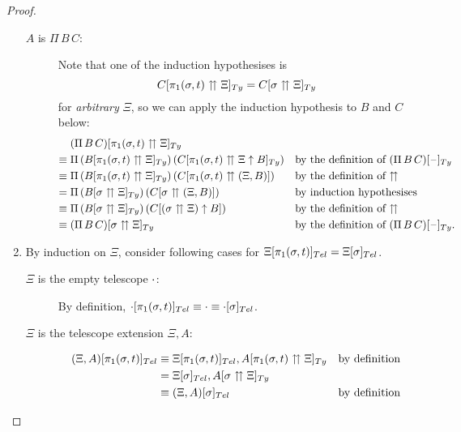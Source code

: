 \documentclass[a4paper,UKenglish,numberwithinsect,cleveref,thm-restate]{lipics-v2021}
\begin{document}
\begin{proof}
\begin{enumerate}
\begin{description}
        \item[$A$ is $\Pi\,B\,C$:]
          Note that one of the induction hypothesises is
          \[
            \subTy{C}{\pi_1(\sigma, t) \upuparrows \Xi} = \subTy{C}{\sigma \upuparrows \Xi}
          \]
          for \emph{arbitrary} $\Xi$, so we can apply the induction hypothesis to $B$ and $C$ below:
          \begin{align*}
            & \subTy{(\Pi\,B\,C)}{\pi_1(\sigma, t) \upuparrows \Xi} \\
            \judgeq{} & \Pi\,(\subTy{B}{\pi_1(\sigma, t) \upuparrows \Xi})\,(\subTy{C}{\pi_1(\sigma, t) \upuparrows \Xi \uparrow B}) && \text{by the definition of $\subTy{(\Pi\,B\,C)}{\blank}$} \\
            \judgeq{} & \Pi\,(\subTy{B}{\pi_1(\sigma, t) \upuparrows \Xi})\,(\sub{C}{\pi_1(\sigma, t) \upuparrows (\Xi, B)}) && \text{by the definition of $\upuparrows$} \\
            ={}       & \Pi\,(\subTy{B}{\sigma \upuparrows \Xi})\,(\sub{C}{\sigma \upuparrows (\Xi, B)}) && \text{by induction hypothesises} \\
            \judgeq{} & \Pi\,(\subTy{B}{\sigma \upuparrows \Xi})\,(\sub{C}{(\sigma \upuparrows \Xi) \uparrow B}) && \text{by the definition of $\upuparrows$} \\
            \judgeq{} & \subTy{(\Pi\,B\,C)}{\sigma\upuparrows \Xi} && \text{by the definition of $\subTy{(\Pi\,B\,C)}{\blank}$.}
          \end{align*}
      \end{description}
    \item By induction on $\Xi$, consider following cases for $\subTel{\Xi}{\pi_1(\sigma, t)} = \subTel{\Xi}{\sigma}$.
      \begin{description}
        \item[$\Xi$ is the empty telescope $\cdot$:] By definition, $\subTel{\emptytel}{\pi_1(\sigma, t)} \judgeq \emptytel \judgeq \subTel{\emptytel}{\sigma}$.
        \item[$\Xi$ is the telescope extension $\Xi, A$:]
          \begin{align*}
            \subTel{(\Xi, A)}{\pi_1(\sigma, t)} & \judgeq \subTel{\Xi}{\pi_1(\sigma, t)}, \subTy{A}{\pi_1(\sigma, t) \upuparrows \Xi} && \text{by definition} \\
                                                & = \subTel{\Xi}{\sigma}, \subTy{A}{\sigma \upuparrows \Xi} \\
                                                & \judgeq \subTel{(\Xi, A)}{\sigma} && \text{by definition}

\end{align*}
\end{description}
\end{enumerate}
\end{proof}
\end{document}
